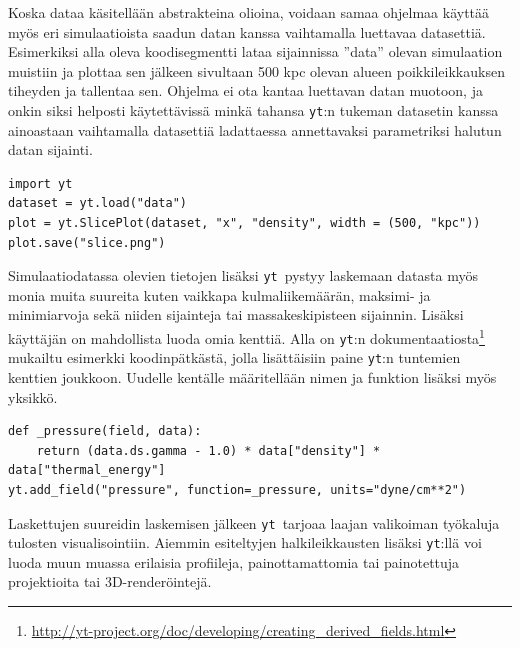 \documentclass[12pt,a4paper]{article}
\newcommand{\yt}{\texttt{yt}}
\begin{document}
Koska dataa käsitellään abstrakteina olioina, voidaan samaa ohjelmaa käyttää myös eri simulaatioista saadun datan kanssa vaihtamalla luettavaa datasettiä. Esimerkiksi alla oleva koodisegmentti lataa sijainnissa ''data'' olevan simulaation muistiin ja plottaa sen jälkeen sivultaan 500 kpc olevan alueen poikkileikkauksen tiheyden ja tallentaa sen. Ohjelma ei ota kantaa luettavan datan muotoon, ja onkin siksi helposti käytettävissä minkä tahansa \yt :n tukeman datasetin kanssa ainoastaan vaihtamalla datasettiä ladattaessa annettavaksi parametriksi halutun datan sijainti. \cite{yt, cookbook}

\begin{minipage}{\textwidth}
\lstset{style=python}
\begin{lstlisting}
import yt
dataset = yt.load("data")
plot = yt.SlicePlot(dataset, "x", "density", width = (500, "kpc"))
plot.save("slice.png")
\end{lstlisting}
\end{minipage}

Simulaatiodatassa olevien tietojen lisäksi \yt\ pystyy laskemaan datasta myös monia muita suureita kuten vaikkapa kulmaliikemäärän, maksimi- ja minimiarvoja sekä niiden sijainteja tai massakeskipisteen sijainnin. Lisäksi käyttäjän on mahdollista luoda omia kenttiä. Alla on \yt :n dokumentaatiosta\footnote{\url{http://yt-project.org/doc/developing/creating_derived_fields.html}} mukailtu esimerkki koodinpätkästä, jolla lisättäisiin paine \yt :n tuntemien kenttien joukkoon. Uudelle kentälle määritellään nimen ja funktion lisäksi myös yksikkö. \cite{yt, derivedfields}

\begin{minipage}{\textwidth}
\lstset{style=python}
\begin{lstlisting}
def _pressure(field, data):
    return (data.ds.gamma - 1.0) * data["density"] * data["thermal_energy"]
yt.add_field("pressure", function=_pressure, units="dyne/cm**2")
\end{lstlisting}%
\end{minipage}

Laskettujen suureidin laskemisen jälkeen \yt\ tarjoaa laajan valikoiman työkaluja tulosten visualisointiin. Aiemmin esiteltyjen halkileikkausten lisäksi \yt :llä voi luoda muun muassa erilaisia profiileja, painottamattomia tai painotettuja projektioita tai 3D-renderöintejä. \cite{yt}
\end{document}
